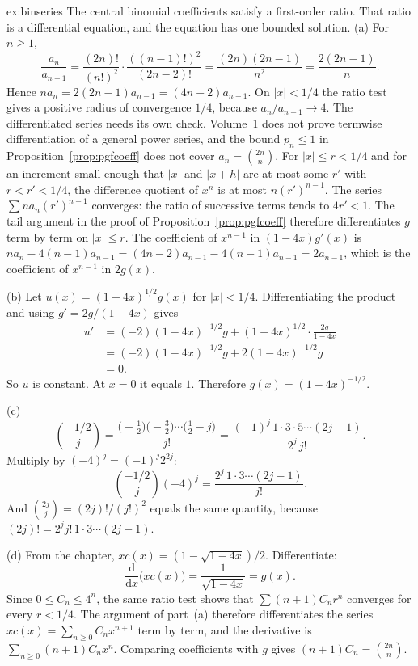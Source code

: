 \begin{solution}{ex:binseries}
\idea The central binomial coefficients satisfy a first-order ratio. That ratio is a differential equation, and the equation has one bounded solution.
\writeup (a) For $n\ge1$,
\[
 \frac{a_n}{a_{n-1}}=\frac{(2n)!}{(n!)^2}\cdot\frac{((n-1)!)^2}{(2n-2)!}=\frac{(2n)(2n-1)}{n^2}=\frac{2(2n-1)}{n}.
\]
Hence $n a_n=2(2n-1)a_{n-1}=(4n-2)a_{n-1}$. On $|x|<1/4$ the ratio test gives a positive radius of convergence $1/4$, because $a_n/a_{n-1}\to4$. The differentiated series needs its own check. Volume~1 does not prove termwise differentiation of a general power series, and the bound $p_n\le1$ in Proposition~\ref{prop:pgfcoeff} does not cover $a_n=\binom{2n}{n}$. For $|x|\le r<1/4$ and for an increment small enough that $|x|$ and $|x+h|$ are at most some $r'$ with $r<r'<1/4$, the difference quotient of $x^n$ is at most $n(r')^{n-1}$. The series $\sum n a_n (r')^{n-1}$ converges: the ratio of successive terms tends to $4r'<1$. The tail argument in the proof of Proposition~\ref{prop:pgfcoeff} therefore differentiates $g$ term by term on $|x|\le r$. The coefficient of $x^{n-1}$ in $(1-4x)g'(x)$ is $n a_n-4(n-1)a_{n-1}=(4n-2)a_{n-1}-4(n-1)a_{n-1}=2a_{n-1}$, which is the coefficient of $x^{n-1}$ in $2g(x)$.

(b) Let $u(x)=(1-4x)^{1/2}g(x)$ for $|x|<1/4$. Differentiating the product and using $g'=2g/(1-4x)$ gives
\begin{align*}
 u'
 &=(-2)(1-4x)^{-1/2}g+(1-4x)^{1/2}\cdot\frac{2g}{1-4x}\\
 &=(-2)(1-4x)^{-1/2}g+2(1-4x)^{-1/2}g\\
 &=0.
\end{align*}
So $u$ is constant. At $x=0$ it equals $1$. Therefore $g(x)=(1-4x)^{-1/2}$.

(c) 
\[
 \binom{-1/2}{j}=\frac{\bigl(-\tfrac12\bigr)\bigl(-\tfrac32\bigr)\cdots\bigl(\tfrac12-j\bigr)}{j!}
 =\frac{(-1)^j\,1\cdot3\cdot5\cdots(2j-1)}{2^j\,j!}.
\]
Multiply by $(-4)^j=(-1)^j 2^{2j}$:
\[
 \binom{-1/2}{j}(-4)^j=\frac{2^j\,1\cdot3\cdots(2j-1)}{j!}.
\]
And $\binom{2j}{j}=(2j)!/(j!)^2$ equals the same quantity, because $(2j)!=2^j j!\,1\cdot3\cdots(2j-1)$.

(d) From the chapter, $xc(x)=(1-\sqrt{1-4x})/2$. Differentiate:
\[
 \frac{\mathrm d}{\mathrm dx}\bigl(xc(x)\bigr)=\frac{1}{\sqrt{1-4x}}=g(x).
\]
Since $0\le C_n\le4^n$, the same ratio test shows that $\sum (n+1)C_n r^n$ converges for every $r<1/4$. The argument of part~(a) therefore differentiates the series $xc(x)=\sum_{n\ge0}C_n x^{n+1}$ term by term, and the derivative is $\sum_{n\ge0}(n+1)C_n x^n$. Comparing coefficients with $g$ gives $(n+1)C_n=\binom{2n}{n}$.
\end{solution}

